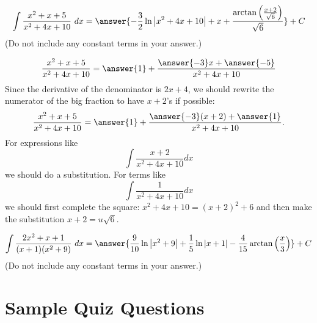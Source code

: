 \documentclass{ximera}
\begin{document}
\begin{exercise}[APEX0604PF20]
\[ \int \frac{x^2+x+5}{x^2+4x+10}\ dx = \answer{-\frac{3}{2} \ln \left|x^2+4 x+10\right|+x+\frac{\arctan \left(\frac{x+2}{\sqrt{6}}\right)}{\sqrt{6}}}+C \]
(Do not include any constant terms in your answer.)
\begin{hint}
\[ \frac{x^2+x+5}{x^2+4x+10} = \answer{1} + \frac{\answer{-3} x + \answer{-5}}{x^{2} + 4 x + 10}  \]
Since the derivative of the denominator is $2x + 4$, we should rewrite the numerator of the big fraction to have $x+2$'s if possible:
\[  \frac{x^2+x+5}{x^2+4x+10} = \answer{1} + \frac{\answer{-3}(x+2) + \answer{1}}{x^2 + 4x + 10}. \]
For expressions like
\[ \int \frac{x+2}{x^2 +4x+10} dx \]
we should do a substitution. For terms like
\[ \int \frac{1}{x^2 + 4x + 10} dx \]
we should first complete the square: $x^2 + 4x + 10 =  (x + 2)^2 + 6$ and then make the substitution $x + 2 = u \sqrt{6}$.
\end{hint}
%
%
\end{exercise}

\begin{exercise}%
\[ \int \frac{2x^2+x+1}{(x+1)(x^2+9)}\ dx = \answer{\frac{9}{10} \ln \left|x^2+9\right|+\frac{1}{5} \ln |x+1|-\frac{4}{15} \arctan \left(\frac{x}{3}\right)} +C\]
(Do not include any constant terms in your answer.)
%
%
\end{exercise}

\section*{Sample Quiz Questions}
\end{document}
